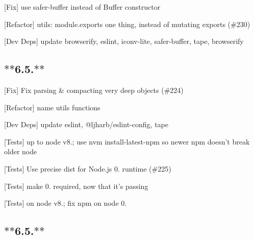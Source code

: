
\begin{DoxyItemize}
\item \mbox{[}Fix\mbox{]} use {\ttfamily safer-\/buffer} instead of {\ttfamily Buffer} constructor
\item \mbox{[}Refactor\mbox{]} utils\+: {\ttfamily module.\+exports} one thing, instead of mutating {\ttfamily exports} (\#230)
\item \mbox{[}Dev Deps\mbox{]} update {\ttfamily browserify}, {\ttfamily eslint}, {\ttfamily iconv-\/lite}, {\ttfamily safer-\/buffer}, {\ttfamily tape}, {\ttfamily browserify}
\end{DoxyItemize}

\subsection*{$\ast$$\ast$6.5.$\ast$$\ast$}


\begin{DoxyItemize}
\item \mbox{[}Fix\mbox{]} Fix parsing \& compacting very deep objects (\#224)
\item \mbox{[}Refactor\mbox{]} name utils functions
\item \mbox{[}Dev Deps\mbox{]} update {\ttfamily eslint}, {\ttfamily @ljharb/eslint-\/config}, {\ttfamily tape}
\item \mbox{[}Tests\mbox{]} up to {\ttfamily node} {\ttfamily v8.}; use {\ttfamily nvm install-\/latest-\/npm} so newer npm doesn’t break older node
\item \mbox{[}Tests\mbox{]} Use precise dist for Node.\+js 0. runtime (\#225)
\item \mbox{[}Tests\mbox{]} make 0. required, now that it’s passing
\item \mbox{[}Tests\mbox{]} on {\ttfamily node} {\ttfamily v8.}; fix npm on node 0.
\end{DoxyItemize}

\subsection*{$\ast$$\ast$6.5.$\ast$$\ast$}


